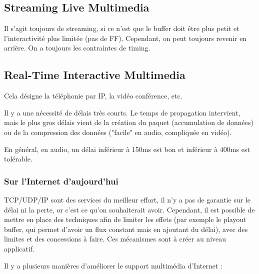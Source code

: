 		\subsection{Streaming Live Multimedia}

		Il s'agit toujours de streaming, si ce n'est que le buffer doit être plus petit et l'interactivité plus limitée (pas de FF). Cependant, on peut toujours revenir en arrière. On a toujours les contraintes de timing.
		
		\subsection{Real-Time Interactive Multimedia}
		
		Cela désigne la téléphonie par IP, la vidéo conférence, etc.
		
		Il y a une nécessité de délais très courts. Le temps de propagation intervient, mais le plus gros délais vient de la création du paquet (accumulation de données) ou de la compression des données ("facile" en audio, compliquée en vidéo).
		
		En général, en audio, un délai inférieur à 150ms est bon et inférieur à 400ms est tolérable.
		
			\subsubsection{Sur l'Internet d'aujourd'hui}
		
			TCP/UDP/IP sont des services du meilleur effort, il n'y a pas de garantie sur le délai ni la perte, or c'est ce qu'on souhaiterait avoir. Cependant, il est possible de mettre en place des techniques afin de limiter les effets (par exemple le playout buffer, qui permet d'avoir un flux constant mais en ajoutant du délai), avec des limites et des concessions à faire. Ces mécanismes sont à créer au niveau applicatif.
		
			Il y a plusieurs manières d'améliorer le support multimédia d'Internet :
		
